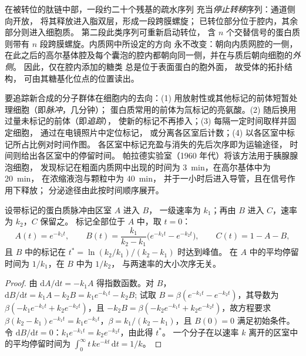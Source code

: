\begin{proposition}[膜蛋白与拓扑结构]\label{prop:b3:membrane-traffic:topology}
在被转位的肽链中部，一段约二十个残基的疏水序列
充当\emph{停止转移}序列：通道侧向开放，
将其释放进入脂双层，形成一段跨膜螺旋；
已转位部分位于腔内，其余部分则进入细胞质。
第二段此类序列可重新启动转位，
含 $n$ 个交替信号的蛋白质
则带有 $n$ 段跨膜螺旋。内质网中所设定的方向
永不改变：朝向内质网腔的一侧，
在此之后的高尔基体腔及每个囊泡的腔内都朝向同一侧，并在与质后朝向细胞的\emph{外侧}。
因此，仅在腔内添加的糖类
总是位于表面蛋白的胞外面，
故受体的拓扑结构，
可由其糖基化位点的位置读出。
\end{proposition}

\begin{method}[脉冲–追踪]\label{met:b3:membrane-traffic:pulse-chase}
要追踪新合成的分子群体在细胞内的去向：(1)
用放射性或其他标记的前体短暂处理细胞（即\emph{脉冲}，几分钟）；
蛋白质常用的前体为氚标记的亮氨酸。(2) 随后换用过量未标记的前体（即\emph{追踪}），
使新的标记不再掺入；(3) 每隔一定时间取样并固定细胞，
通过在电镜照片中定位标记，
或分离各区室后计数；(4) 以各区室中标记所占比例对时间作图。
各区室中标记充盈与消失的先后次序即为运输途径，
时间则给出各区室中的停留时间。
帕拉德实验室（1960 年代）将该方法用于胰腺腺泡细胞，
发现标记在粗面内质网中出现的时间为
\qty{3}{min}，在高尔基体中为 \qty{20}{min}，
在浓缩液泡与颗粒中为 \qty{40}{min}，
并于一小时后进入导管，且在信号作用下释放；
分泌途径由此按时间顺序展开。
\end{method}

\begin{theorem}\label{thm:b3:membrane-traffic:pulse-chase}
设带标记的蛋白质脉冲由区室 $A$ 进入 $B$，
一级速率为 $k_{1}$；再由 $B$ 进入 $C$，速率为 $k_{2}$，$C$ 保留之。
标记全部位于 $A$ 中，取 $t = 0$：
\[
A(t) = e^{-k_{1}t},\qquad
B(t) = \frac{k_{1}}{k_{2} - k_{1}}\bigl(e^{-k_{1}t} - e^{-k_{2}t}\bigr),
\qquad
C(t) = 1 - A - B,
\]
且 $B$ 中的标记在 $t^{*} = \ln(k_{2}/k_{1})/(k_{2} - k_{1})$ 时达到峰值。
在 $A$ 中的平均停留时间为 $1/k_{1}$，在 $B$ 中为 $1/k_{2}$，
与两速率的大小次序无关。
\end{theorem}
\begin{proof}
由 $\mathrm{d}A/\mathrm{d}t = -k_{1}A$ 得指数函数。对 $B$，
$\mathrm{d}B/\mathrm{d}t = k_{1}A - k_{2}B = k_{1}e^{-k_{1}t} - k_{2}B$;
试取 $B = \beta(e^{-k_{1}t} - e^{-k_{2}t})$，其导数为
$\beta(-k_{1}e^{-k_{1}t} + k_{2}e^{-k_{2}t})$，且 $-k_{2}B = \beta(-k_{2}
e^{-k_{1}t} + k_{2}e^{-k_{2}t})$，故方程要求 $\beta(k_{2}
- k_{1})e^{-k_{1}t} = k_{1}e^{-k_{1}t}$，$\beta = k_{1}/(k_{2} -
k_{1})$，且 $B(0) = 0$ 满足初始条件。令 $\mathrm{d}B/\mathrm{d}t =
0$：$k_{1}e^{-k_{1}t} = k_{2}e^{-k_{2}t}$，由此得 $t^{*}$。
一个分子在以速率 $k$ 离开的区室中的平均停留时间为 $\int_{0}^{
\infty} t\,k e^{-kt}\,\mathrm{d}t = 1/k$。
\end{proof}

